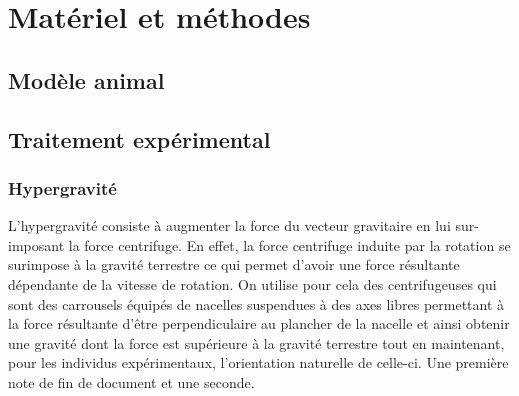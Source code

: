 \section{Matériel et méthodes}
\subsection{Modèle animal}
\lipsum[1]
\subsection{Traitement expérimental}
\subsubsection{Hypergravité}
\label{hypergravite} %
L'hypergravité consiste à augmenter la force du vecteur gravitaire en lui sur-imposant la force centrifuge. En effet, la force centrifuge induite par la rotation se surimpose à la gravité terrestre ce qui permet d'avoir une force résultante dépendante de la vitesse de rotation. On utilise pour cela des centrifugeuses qui sont des carrousels équipés de nacelles suspendues à des axes libres permettant à la force résultante d'être perpendiculaire au plancher de la nacelle et ainsi obtenir une \og gravité \fg{} dont la force est supérieure à la gravité terrestre tout en maintenant, pour les individus expérimentaux, l'orientation \og naturelle \fg{} de celle-ci.
\lipsum[1-5]
Une première note de fin de document et une seconde.
